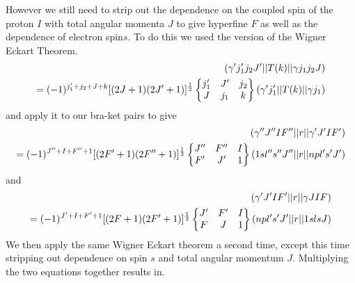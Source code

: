 However we still need to strip out the dependence on the coupled spin of the proton \(I\) with total angular momenta \(J\) to give hyperfine \(F\) as well as the dependence of electron spin\(s\). To do this we used the version of the Wigner Eckart Theorem.
\begin{equation}
\begin{split}
        (\gamma'j_1'j_2J'\abs{\abs{T(k)}}\gamma j_1 j_2 J)\\
        =(-1)^{j_1'+j_2+J+k}[(2J+1)(2J'+1)]^{\frac{1}{2}}
        \begin{Bmatrix}
        j_1' & J'  &j_2\\
        J    & j_1 &k
        \end{Bmatrix}
        (\gamma' j_1'\abs{\abs{T(k)}}\gamma j_1)
\end{split}
\end{equation}
and apply it to our bra-ket pairs to give
\begin{equation}
\begin{split}
        (\gamma''J''IF''\abs{\abs{r}}\gamma' J' I F')\\
        =(-1)^{J''+I+F''+1}[(2F'+1)(2F''+1)]^{\frac{1}{2}}
        \begin{Bmatrix}
        J'' & F''  &I\\
        F'    & J' &1
        \end{Bmatrix}
        (1sl''s'' J''\abs{\abs{r}}np l's' J')
\end{split}
\end{equation}
and
\begin{equation}
\begin{split}
        (\gamma'J'IF'\abs{\abs{r}}\gamma J I F)\\
        =(-1)^{J'+I+F'+1}[(2F+1)(2F'+1)]^{\frac{1}{2}}
        \begin{Bmatrix}
        J' & F'  &I\\
        F    & J &1
        \end{Bmatrix}
        (np l' s' J'\abs{\abs{r}}1s ls J)
\end{split}
\end{equation}
We then apply the same Wigner Eckart theorem a second time, except this time stripping out dependence on spin \(s\) and total angular momentum \(J\). Multiplying the two equations together results in.
